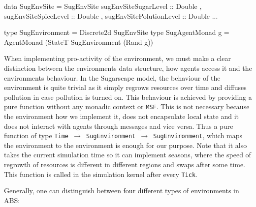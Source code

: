 \begin{HaskellCode}
data SugEnvSite = SugEnvSite 
  { sugEnvSiteSugarLevel    :: Double
  , sugEnvSiteSpiceLevel    :: Double
  , sugEnvSitePolutionLevel :: Double
  ...
  }

type SugEnvironment  = Discrete2d SugEnvSite
type SugAgentMonad g = AgentMonad (StateT SugEnvironment (Rand g))
\end{HaskellCode}

When implementing pro-activity of the environment, we must make a clear distinction between the environments data structure, how agents access it and the environments behaviour. In the Sugarscape model, the behaviour of the environment is quite trivial as it simply regrows resources over time and diffuses pollution in case pollution is turned on. This behaviour is achieved by providing a pure function without any monadic context or \texttt{MSF}. This is not necessary because the environment how we implement it, does not encapsulate local state and it does not interact with agents through messages and vice versa. Thus a pure function of type \texttt{Time $\rightarrow$ SugEnvironment $\rightarrow$ SugEnvironment}, which maps the environment to the environment is enough for our purpose. Note that it also takes the current simulation time so it can implement seasons, where the speed of regrowth of resources is different in different regions and swaps after some time. This function is called in the simulation kernel after every \texttt{Tick}.

\medskip

Generally, one can distinguish between four different types of environments in ABS:

